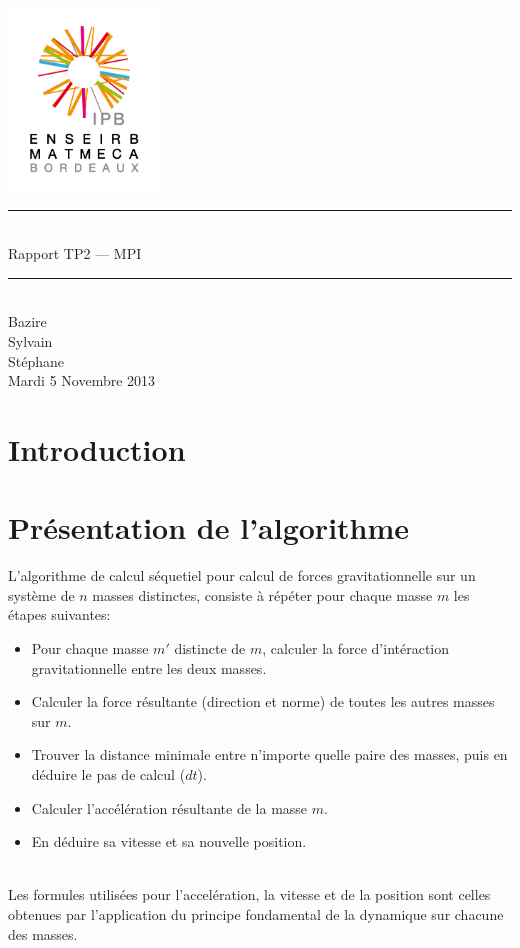 \documentclass[a4paper,11pt]{article}
\begin{document}
\begin{titlepage}
  \begin{center}

    \begin{center}
      \includegraphics[width=4cm]{EM.jpg}
    \end{center}

    \vspace*{1cm}
        
    \rule{0.75\linewidth}{0.7mm}\\[0.4cm]
    {\Huge Rapport TP2 --- MPI\\[0.4cm]}
    \rule{0.75\linewidth}{0.7mm} \\[1.5cm]

    {\Large Bazire \\Sylvain {}\\Stéphane \\[2cm]}
    {\Large Mardi 5 Novembre 2013}
  \end{center}
\end{titlepage}

\tableofcontents
\clearpage
\section{Introduction}



\section{Présentation de l'algorithme}
L'algorithme de calcul séquetiel pour calcul de forces gravitationnelle sur un système de $n$ masses distinctes, consiste à répéter pour chaque masse $m$ les étapes suivantes:\\

\begin{itemize}
\item Pour chaque masse $m'$ distincte de $m$, calculer la force d'intéraction gravitationnelle entre les deux masses.
\item Calculer la force résultante (direction et norme) de toutes les autres masses sur $m$.
\item Trouver la distance minimale entre n'importe quelle paire des masses, puis en déduire le pas de calcul ($dt$).
\item Calculer l'accélération résultante de la masse $m$.
\item En déduire sa vitesse et sa nouvelle position.
\end{itemize}
\\
Les formules utilisées pour l'accelération, la vitesse et de la position sont celles obtenues par l'application du principe fondamental de la dynamique sur chacune des masses.
\end{document}
